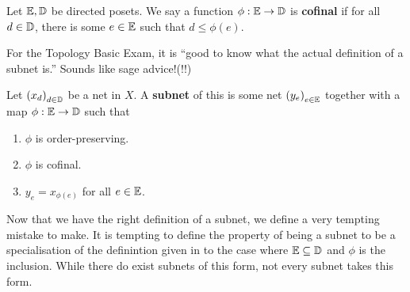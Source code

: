 \begin{boxdefinition}[Cofinality]
    Let $\mathbb{E}, \mathbb{D}$ be directed posets. We say a function $\phi : \mathbb{E} \to \mathbb{D}$ is \textbf{cofinal} if for all $d \in \mathbb{D}$, there is some $e \in \mathbb{E}$ such that $d \leq \phi(e)$.
\end{boxdefinition}

For the Topology Basic Exam, it is ``good to know what the actual definition of a subnet is.'' Sounds like sage advice!(!!)

\begin{boxdefinition}[Subnet]\label{Ch2:Def:Subnet}
    Let $\left( x_d \right)_{d \in \mathbb{D}}$ be a net in $X$. A \textbf{subnet} of this is some net $\left( y_e \right)_{e \in \mathbb{E}}$ together with a map $\phi : \mathbb{E} \to \mathbb{D}$ such that
    \begin{enumerate}
        \item $\phi$ is order-preserving.
        \item $\phi$ is cofinal.
        \item $y_e = x_{\phi(e)}$ for all $e \in \mathbb{E}$.
    \end{enumerate}
\end{boxdefinition}

Now that we have the right definition of a subnet, we define a very tempting mistake to make. It is tempting to define the property of being a subnet to be a specialisation of the definintion given in  to the case where $\mathbb{E} \subseteq \mathbb{D}$ and $\phi$ is the inclusion. While there do exist subnets of this form, not every subnet takes this form.